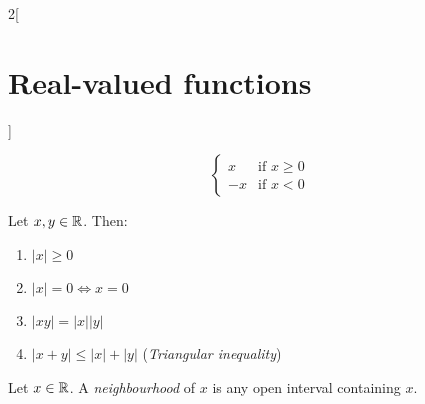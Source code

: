 \documentclass[../../../main_math.tex]{subfiles}
\begin{document}
\begin{multicols}{2}[\section{Real-valued functions}]
\begin{definition}
\begin{equation*}
\begin{cases}
        x  & \text{if }x\geq 0 \\
        -x & \text{if }x<0
      \end{cases}
    \end{equation*}
  \end{definition}
  \begin{lemma}
    Let $x,y\in\mathbb{R}$. Then:
    \begin{enumerate}
      \item $|x|\geq 0$
      \item $|x|=0\iff x=0$
      \item $|xy|=|x||y|$
      \item $|x+y|\leq|x|+|y|$ (\emph{Triangular inequality})
    \end{enumerate}
  \end{lemma}
  \begin{definition}
    Let $x\in\mathbb{R}$. A \emph{neighbourhood} of $x$ is any open interval containing $x$.
  \end{definition}

\end{multicols}
\end{document}

